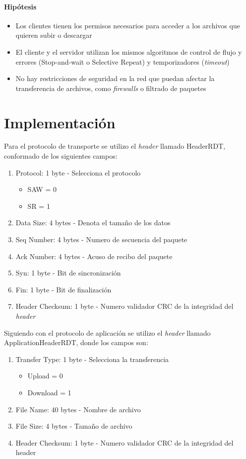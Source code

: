 \documentclass[11pt,a4paper]{article}
\begin{document}
\paragraph{Hipótesis}
\begin{itemize}
    \item Los clientes tienen los permisos necesarios para acceder a los archivos que quieren subir o descargar
    \item El cliente y el servidor utilizan los mismos algoritmos de control de flujo y errores (Stop-and-wait o Selective Repeat) y temporizadores (\textit{timeout})
    \item No hay restricciones de seguridad en la red que puedan afectar la transferencia de archivos, como \textit{firewalls} o filtrado de paquetes
    
\end{itemize}

\newpage

\section{Implementación}

Para el protocolo de transporte se utilizo el \textit{header} llamado HeaderRDT, conformado de los siguientes campos:
\begin{enumerate}
    \item Protocol: 1 byte - Selecciona el protocolo
    \begin{itemize}
        \item SAW = 0
        \item SR = 1
    \end{itemize}
    \item Data Size: 4 bytes - Denota el tamaño de los datos
    \item Seq Number: 4 bytes - Numero de secuencia del paquete
    \item Ack Number: 4 bytes - Acuso de recibo del paquete
    \item Syn: 1 byte - Bit de sincronización
    \item Fin: 1 byte - Bit de finalización
    \item Header Checksum: 1 byte - Numero validador CRC de la integridad del \textit{header}
\end{enumerate}

Siguiendo con el protocolo de aplicación se utilizo el \textit{header} llamado ApplicationHeaderRDT, donde los campos son:
\begin{enumerate}
    \item Transfer Type: 1 byte - Selecciona la transferencia
    \begin{itemize}
        \item Upload = 0
        \item Download = 1
    \end{itemize}
    \item File Name: 40 bytes - Nombre de archivo
    \item File Size: 4 bytes - Tamaño de archivo
    \item Header Checksum: 1 byte - Numero validador CRC de la integridad del header
\end{enumerate}
\end{document}
